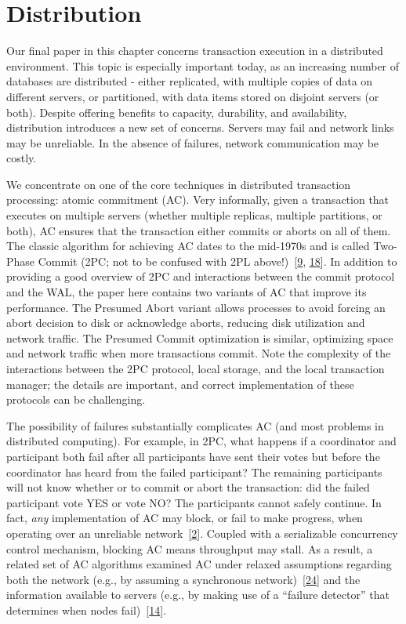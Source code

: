 \documentclass[b5paper,11pt,twoside,openright]{book}
\newcommand\Section[2]{
  \hypertarget{#1}{
    \section{#2}\label{#1}
  }
}
\begin{document}
\Section{distribution}{%
Distribution
}

Our final paper in this chapter concerns transaction execution in a
distributed environment. This topic is especially important today, as an
increasing number of databases are distributed - either replicated, with
multiple copies of data on different servers, or partitioned, with data
items stored on disjoint servers (or both). Despite offering benefits to
capacity, durability, and availability, distribution introduces a new
set of concerns. Servers may fail and network links may be unreliable.
In the absence of failures, network communication may be costly.

We concentrate on one of the core techniques in distributed transaction
processing: atomic commitment (AC). Very informally, given a transaction
that executes on multiple servers (whether multiple replicas, multiple
partitions, or both), AC ensures that the transaction either commits or
aborts on all of them. The classic algorithm for achieving AC dates to
the mid-1970s and is called Two-Phase Commit (2PC; not to be confused
with 2PL above!)~{{[}\protect\hyperlink{ref-gray-2pc}{9},
  \protect\hyperlink{ref-lampson-2pc}{18}{]}}. In addition to providing a
good overview of 2PC and interactions between the commit protocol and
the WAL, the paper here contains two variants of AC that improve its
performance. The Presumed Abort variant allows processes to avoid
forcing an abort decision to disk or acknowledge aborts, reducing disk
utilization and network traffic. The Presumed Commit optimization is
similar, optimizing space and network traffic when more transactions
commit. Note the complexity of the interactions between the 2PC
protocol, local storage, and the local transaction manager; the details
are important, and correct implementation of these protocols can be
challenging.

The possibility of failures substantially complicates AC (and most
problems in distributed computing). For example, in 2PC, what happens if
a coordinator and participant both fail after all participants have sent
their votes but before the coordinator has heard from the failed
participant? The remaining participants will not know whether or to
commit or abort the transaction: did the failed participant vote YES or
vote NO? The participants cannot safely continue. In fact, \emph{any}
implementation of AC may block, or fail to make progress, when operating
over an unreliable
network~{{[}\protect\hyperlink{ref-bernstein-book}{2}{]}}. Coupled with
a serializable concurrency control mechanism, blocking AC means
throughput may stall. As a result, a related set of AC algorithms
examined AC under relaxed assumptions regarding both the network (e.g.,
by assuming a synchronous
network)~{{[}\protect\hyperlink{ref-3pc}{24}{]}} and the information
available to servers (e.g., by making use of a ``failure detector'' that
determines when nodes fail)~{{[}\protect\hyperlink{ref-ac-srds}{14}{]}}.
\end{document}
